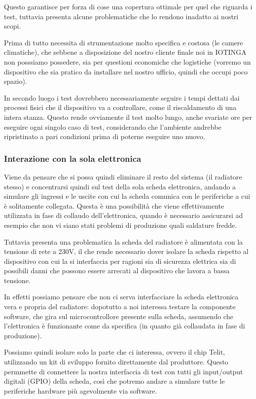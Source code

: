 \documentclass[a4paper,titlepage]{article}
\begin{document}
Questo garantisce per forza di cose una copertura ottimale per quel che riguarda i
test, tuttavia presenta alcune problematiche che lo rendono inadatto ai nostri scopi.

Prima di tutto necessita di strumentazione molto specifica e costosa (le camere climatiche),
che sebbene a disposizione del nostro cliente finale noi in IOTINGA non posssiamo
possedere, sia per questioni economiche che logistiche (vorremo un dispositivo che
sia pratico da installare nel nostro ufficio, quindi che occupi poco spazio).

In secondo luogo i test dovrebbero necessariamente seguire i tempi dettati dai processi
fisici che il dispositivo va a controllare, come il riscaldamento di una intera stanza.
Questo rende ovviamente il test molto lungo, anche svariate ore per eseguire ogni singolo
caso di test, considerando che l'ambiente andrebbe ripristinato a pari condizioni prima
di poterne eseguire uno nuovo.

\subsubsection{Interazione con la sola elettronica}

Viene da pensare che si possa quindi eliminare il resto del sistema (il radiatore
stesso) e concentrarsi quindi sul test della sola scheda elettronica, andando a
simulare gli ingressi e le uscite con cui la scheda comunica con le periferiche
a cui è solitamente collegata. Questa è una possibilità che viene effettivamente
utilizzata in fase di collaudo dell'elettronica, quando è necessario assicurarsi ad
esempio che non vi siano stati problemi di produzione quali saldature fredde.

Tuttavia presenta una problematica la scheda del radiatore è alimentata con
la tensione di rete a 230V, il che rende necessario dover isolare la scheda rispetto
al dispositivo con cui la si interfaccia per ragioni sia di sicurezza elettrica sia
di possibili danni che possono essere arrecati al dispositivo che lavora a bassa tensione.

In effetti possiamo pensare che non ci serva interfacciare la scheda elettronica
vera e propria del radiatore: dopotutto a noi interessa testare la componente software,
che gira sul microcontrollore presente sulla scheda, assumendo che l'elettronica è
funzionante come da specifica (in quanto già collaudata in fase di produzione).

Possiamo quindi isolare solo la parte che ci interessa, ovvero il chip Telit, utilizzando
un kit di sviluppo fornito direttamente dal produttore. Questo permmette di connettere
la nostra interfaccia di test con tutti gli input/output digitali (GPIO) della scheda,
così che potremo andare a simulare tutte le periferiche hardware più agevolmente via software.
\end{document}
